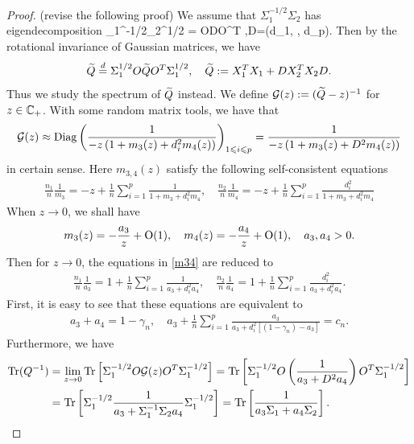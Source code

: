 \begin{proof} 
{\color{blue}(revise the following proof)} We assume that $ \Sigma_1^{-1/2}\Sigma_2$ has eigendecomposition
\be  \label{eigen}
\Sigma_1^{-1/2}\Sigma_2^{1/2} = ODO^T ,\quad D=(d_1, \cdots, d_p).
\ee
Then by the rotational invariance of Gaussian matrices, we have
$$\widetilde Q \overset{d}{=}\Sigma_1^{1/2} O \widetilde Q O^T \Sigma_1^{1/2},\quad \widetilde Q:=   X_1^T X_1  + D X_2^T X_2 D .$$
Thus we study the spectrum of $\widetilde Q$ instead. We define $\mathcal G(z):= (\widetilde Q-z)^{-1}$ for $z\in \mathbb{C}_+$. With some random matrix tools, we have that 
$$\mathcal G(z) \approx \operatorname{Diag}\left( \frac{1}{-z\left( 1+ m_3(z) + d_i^2 m_4(z)\right)}\right)_{1\leqslant i \leqslant p}= \frac{1}{-z\left( 1+ m_3(z) + D^2 m_4(z)\right)} $$
{\cob in certain sense}. Here $m_{3,4}(z)$ satisfy the following self-consistent equations
\begin{align}\label{m34}
\frac{n_1}{n}\frac1{m_3} = - z +\frac1n\sum_{i=1}^p \frac1{  1+m_3 + d_i^2m_4  } ,\quad \frac{n_2}{n}\frac1{m_4} = - z +\frac1n\sum_{i=1}^p \frac{d_i^2 }{  1+m_3 + d_i^2m_4  } 
\end{align}
When $z\to 0$, we shall have
$$m_3(z)= - \frac{a_3}{z} + \operatorname{O}(1), \quad m_4(z)= - \frac{a_4}{z} + \operatorname{O}(1),\quad a_3,a_4>0.$$
Then for $z\to0$, the equations in \eqref{m34} are reduced to
\begin{align}\label{m35}
\frac{n_1}{n}\frac{1}{a_3} = 1 +\frac1n\sum_{i=1}^p \frac{1}{a_3 + d_i^2a_4  } ,\quad \frac{n_2}{n}\frac1{a_4} = 1 +\frac1n\sum_{i=1}^p \frac{d_i^2 }{  a_3 + d_i^2 a_4 }. 
\end{align}
First, it is easy to see that these equations are equivalent to
\begin{align} a_3 + a_4 = 1- \gamma_n, \quad a_3 +\frac1n\sum_{i=1}^p \frac{a_3}{a_3 + d_i^2[(1-\gamma_n)-a_3]  }=c_n  .\end{align}
Furthermore, we have
\begin{align*}
\operatorname{Tr} (Q^{-1}) &= \lim_{z\to 0}\operatorname{Tr} \left[\Sigma_1^{-1/2} O \mathcal G(z)O^T \Sigma_1^{-1/2}\right]
=\operatorname{Tr} \left[\Sigma_1^{-1/2} O  \left( \frac{1}{a_3 + D^2 a_4 }\right) O^T \Sigma_1^{-1/2}\right] \\
&=\operatorname{Tr} \left[\Sigma_1^{-1/2}  \frac{1}{a_3+ \Sigma_1^{-1}\Sigma_2 a_4} \Sigma_1^{-1/2}\right]=\operatorname{Tr} \left[ \frac{1}{a_3\Sigma_1 + a_4\Sigma_2 } \right].
\end{align*}
\end{proof}

